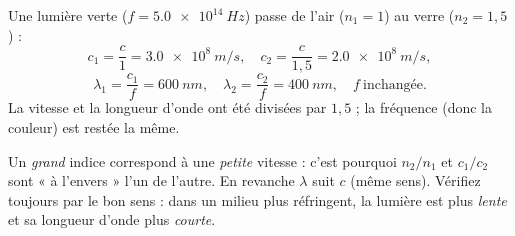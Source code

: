 \documentclass[11pt,a4paper]{article}
\begin{document}
\begin{exemplebox}
Une lumière verte ($f=\qty{5.0e14}{Hz}$) passe de l'air ($n_1=1$) au verre ($n_2=1{,}5$) :
\[ c_1=\frac{c}{1}=\qty{3.0e8}{m/s},\quad c_2=\frac{c}{1{,}5}=\qty{2.0e8}{m/s}, \]
\[ \lambda_1=\frac{c_1}{f}=\qty{600}{nm},\quad \lambda_2=\frac{c_2}{f}=\qty{400}{nm},\quad f\ \text{inchangée}. \]
La vitesse et la longueur d'onde ont été divisées par $1{,}5$ ; la fréquence (donc la couleur) est
restée la même.
\end{exemplebox}

\begin{piege}
Un \emph{grand} indice correspond à une \emph{petite} vitesse : c'est pourquoi $n_2/n_1$ et $c_1/c_2$
sont « à l'envers » l'un de l'autre. En revanche $\lambda$ suit $c$ (même sens). Vérifiez toujours par
le bon sens : dans un milieu plus réfringent, la lumière est plus \emph{lente} et sa longueur d'onde
plus \emph{courte}.
\end{piege}
\end{document}

